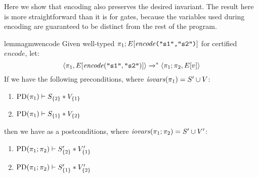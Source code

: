 Here we show that encoding also preserves the desired invariant.
The result here is more straightforward than it is for gates, because
the variables used during encoding are guaranteed to be distinct from
the rest of the program.
\begin{restatable}{lemma}{gmwencode}
  \label{lemma-gmw-encode}
  Given well-typed $\pi_1;E[\mathit{encode}\texttt{("s1","s2")}]$ for certified $\mathit{encode}$, let:
  $$
  \langle \pi_1,E[\mathit{encode}(\texttt{"s1"},\texttt{"s2"})] \rangle \xrightarrow{}^{*}
  \langle \pi_1;\pi_2,E[v] \rangle
  $$
  If we have the following preconditions, where $\mathit{iovars}(\pi_1) = S' \cup V$:
  \begin{enumerate}[\hspace{5mm}i.]
  \item $\mathrm{PD}(\pi_1) \vdash S_{\{2\}} * V_{\{1\}}$
  \item $\mathrm{PD}(\pi_1) \vdash S_{\{1\}} * V_{\{2\}}$
  \end{enumerate}
  then we have as a postconditions, where $\mathit{iovars}(\pi_1;\pi_2) = S' \cup V'$: 
  \begin{enumerate}[\hspace{5mm}i.]
  \item $\mathrm{PD}(\pi_1;\pi_2) \vdash S'_{\{2\}} * V'_{\{1\}}$
  \item $\mathrm{PD}(\pi_1;\pi_2) \vdash S'_{\{1\}} * V'_{\{2\}}$
  \end{enumerate}
\end{restatable}

